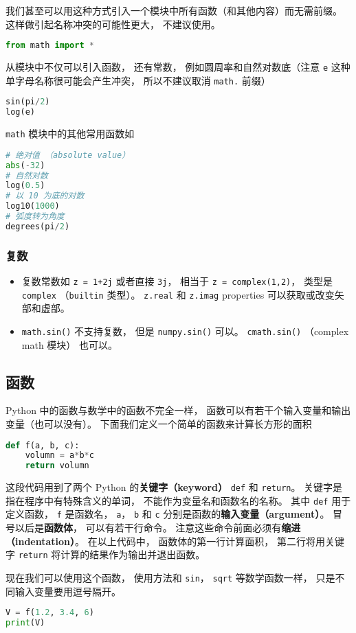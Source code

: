 我们甚至可以用这种方式引入一个模块中所有函数（和其他内容）而无需前缀。 这样做引起名称冲突的可能性更大， 不建议使用。
\begin{lstlisting}[language=python]
from math import *
\end{lstlisting}
从模块中不仅可以引入函数， 还有常数， 例如圆周率和自然对数底（注意 \verb|e| 这种单字母名称很可能会产生冲突， 所以不建议取消 \verb|math.| 前缀）
\begin{lstlisting}[language=python]
sin(pi/2)
log(e)
\end{lstlisting}

\verb|math| 模块中的其他常用函数如
\begin{lstlisting}[language=python]
# 绝对值 （absolute value）
abs(-32)
# 自然对数
log(0.5)
# 以 10 为底的对数
log10(1000)
# 弧度转为角度
degrees(pi/2)
\end{lstlisting}

\subsubsection{复数}
\begin{itemize}
\item 复数常数如 \verb|z = 1+2j| 或者直接 \verb|3j|， 相当于 \verb|z = complex(1,2)|， 类型是 \verb|complex| （\verb|builtin| 类型）。 \verb|z.real| 和 \verb|z.imag| properties 可以获取或改变矢部和虚部。
\item \verb|math.sin()| 不支持复数， 但是 \verb|numpy.sin()| 可以。 \verb|cmath.sin()| （complex math 模块） 也可以。
\end{itemize}

\subsection{函数}
Python 中的函数与数学中的函数不完全一样， 函数可以有若干个输入变量和输出变量（也可以没有）。 下面我们定义一个简单的函数来计算长方形的面积
\begin{lstlisting}[language=python]
def f(a, b, c):
    volumn = a*b*c
    return volumn
\end{lstlisting}
这段代码用到了两个 Python 的\textbf{关键字（keyword）} \verb|def| 和 \verb|return|。 关键字是指在程序中有特殊含义的单词， 不能作为变量名和函数名的名称。 其中 \verb|def| 用于定义函数， \verb|f| 是函数名， \verb|a|， \verb|b| 和 \verb|c| 分别是函数的\textbf{输入变量（argument）}。 冒号以后是\textbf{函数体}， 可以有若干行命令。 注意这些命令前面必须有\textbf{缩进（indentation）}。  在以上代码中， 函数体的第一行计算面积， 第二行将用关键字 \verb|return| 将计算的结果作为输出并退出函数。

现在我们可以使用这个函数， 使用方法和 \verb|sin|， \verb|sqrt| 等数学函数一样， 只是不同输入变量要用逗号隔开。
\begin{lstlisting}[language=python]
V = f(1.2, 3.4, 6)
print(V)
\end{lstlisting}

